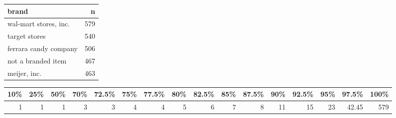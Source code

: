 \documentclass[
]{article}
\newenvironment{Shaded}{\begin{snugshade}}{\end{snugshade}}
\newcommand{\DataTypeTok}[1]{\textcolor[rgb]{0.13,0.29,0.53}{#1}}
\newcommand{\DecValTok}[1]{\textcolor[rgb]{0.00,0.00,0.81}{#1}}
\newcommand{\FloatTok}[1]{\textcolor[rgb]{0.00,0.00,0.81}{#1}}
\newcommand{\KeywordTok}[1]{\textcolor[rgb]{0.13,0.29,0.53}{\textbf{#1}}}
\newcommand{\NormalTok}[1]{#1}
\newcommand{\OperatorTok}[1]{\textcolor[rgb]{0.81,0.36,0.00}{\textbf{#1}}}
\newcommand{\StringTok}[1]{\textcolor[rgb]{0.31,0.60,0.02}{#1}}
\begin{document}
\begin{table}[H]
\centering\begingroup\fontsize{8}{10}\selectfont

\begin{tabular}{lr}
\toprule
brand & n\\
\midrule
\rowcolor{gray!6}  wal-mart stores, inc. & 579\\
target stores & 540\\
\rowcolor{gray!6}  ferrara candy company & 506\\
not a branded item & 467\\
\rowcolor{gray!6}  meijer, inc. & 463\\
\bottomrule
\end{tabular}
\endgroup{}
\end{table}

\begin{Shaded}
\end{Shaded}

\begin{table}[H]
\centering\begingroup\fontsize{8}{10}\selectfont

\begin{tabular}{rrrrrrrrrrrrrrrr}
\toprule
10\% & 25\% & 50\% & 70\% & 72.5\% & 75\% & 77.5\% & 80\% & 82.5\% & 85\% & 87.5\% & 90\% & 92.5\% & 95\% & 97.5\% & 100\%\\
\midrule
\rowcolor{gray!6}  1 & 1 & 1 & 3 & 3 & 4 & 4 & 5 & 6 & 7 & 8 & 11 & 15 & 23 & 42.45 & 579\\
\bottomrule
\end{tabular}
\endgroup{}
\end{table}
\end{document}
